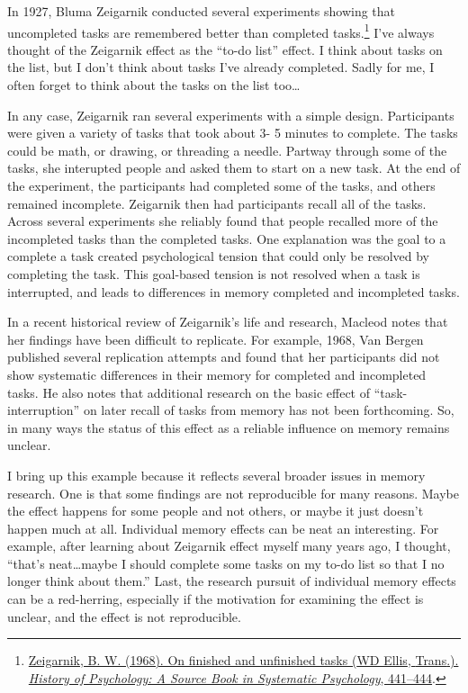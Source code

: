 \documentclass[
  oneside,
  12pt]{crumpbook}
\begin{document}
In 1927, Bluma Zeigarnik conducted several experiments showing that uncompleted tasks are remembered better than completed tasks.\footnote{\protect\hyperlink{ref-zeigarnikFinishedUnfinishedTasks1968}{Zeigarnik, B. W. (1968). On finished and unfinished tasks ({WD Ellis}, {Trans}.). \emph{History of Psychology: A Source Book in Systematic Psychology}, 441--444}.} I've always thought of the Zeigarnik effect as the ``to-do list'' effect. I think about tasks on the list, but I don't think about tasks I've already completed. Sadly for me, I often forget to think about the tasks on the list too\ldots{}

In any case, Zeigarnik ran several experiments with a simple design. Participants were given a variety of tasks that took about 3- 5 minutes to complete. The tasks could be math, or drawing, or threading a needle. Partway through some of the tasks, she interupted people and asked them to start on a new task. At the end of the experiment, the participants had completed some of the tasks, and others remained incomplete. Zeigarnik then had participants recall all of the tasks. Across several experiments she reliably found that people recalled more of the incompleted tasks than the completed tasks. One explanation was the goal to a complete a task created psychological tension that could only be resolved by completing the task. This goal-based tension is not resolved when a task is interrupted, and leads to differences in memory completed and incompleted tasks.

In a recent historical review of Zeigarnik's life and research, Macleod notes that her findings have been difficult to replicate. For example, 1968, Van Bergen published several replication attempts and found that her participants did not show systematic differences in their memory for completed and incompleted tasks. He also notes that additional research on the basic effect of ``task-interruption'' on later recall of tasks from memory has not been forthcoming. So, in many ways the status of this effect as a reliable influence on memory remains unclear.

I bring up this example because it reflects several broader issues in memory research. One is that some findings are not reproducible for many reasons. Maybe the effect happens for some people and not others, or maybe it just doesn't happen much at all. Individual memory effects can be neat an interesting. For example, after learning about Zeigarnik effect myself many years ago, I thought, ``that's neat\ldots maybe I should complete some tasks on my to-do list so that I no longer think about them.'' Last, the research pursuit of individual memory effects can be a red-herring, especially if the motivation for examining the effect is unclear, and the effect is not reproducible.
\end{document}
